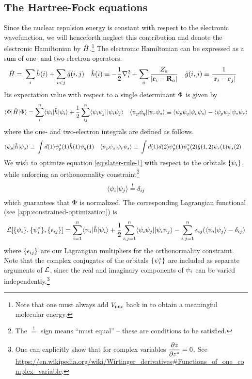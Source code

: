 \documentclass[11pt]{article}
\numberwithin{equation}{section}
\begin{document}
\subsection{The Hartree-Fock equations}

Since the nuclear repulsion energy is constant with respect to the electronic wavefunction, we will henceforth neglect this contribution and denote the electronic Hamiltonian by $\hat{H}$.\footnote{Note that one must always add $V_{\mathrm{nuc}}$ back in to obtain a meaningful molecular energy.}
The electronic Hamiltonian can be expressed as a sum of one- and two-electron operators.
\begin{align}
  \hat{H}
=&\
  \sum_i
  \hat{h}(i)
+
  \sum_{i<j}
  \hat{g}(i,j)
&
  \hat{h}(i)
&\equiv
-
  \frac {1}{2}
  \nabla_i^2
+
  \sum_a
  \frac {Z_a}{|\mathbf{r}_i-\mathbf{R}_a|}
&
  \hat{g}(i,j)
&\equiv
  \frac {1}{|\mathbf{r}_i-\mathbf{r}_j|}
\end{align}
Its expectation value with respect to a single determinant $\Phi $ is given by
\begin{align}
\label{eq:slater-rule-1}
  \langle\Phi |\hat{H}|\Phi \rangle
=
\sum_{i}^n
  \langle\psi _i|\hat{h}|\psi _i\rangle
+\frac {1}{2}\sum_{ij}^n
  \langle\psi _i\psi _j||\psi _i\psi _j\rangle
&&
  \langle\psi _p\psi _q||\psi _r\psi _s\rangle
\equiv
  \langle\psi _p\psi _q|\psi _r\psi _s\rangle
-
  \langle\psi _p\psi _q|\psi _s\psi _r\rangle
\end{align}
where the one- and two-electron integrals are defined as follows.
\begin{align}
\label{eq:one-and-two-electron-integrals}
  \langle\psi _p|\hat{h}|\psi _q\rangle
\equiv&\
  \int
  d(1)
  \psi _p^*(1)
  \hat{h}(1)
  \psi _q(1)
&
  \langle\psi _p\psi _q|\psi _r\psi _s\rangle
\equiv&\
  \int
  d(1)d(2)
  \psi _p^*(1)\psi _q^*(2)
  \hat{g}(1,2)
  \psi _r(1)\psi _s(2)
\end{align}
We wish to optimize equation \ref{eq:slater-rule-1} with respect to the orbitals $\{\psi _i\}$, while enforcing an orthonormality constraint\footnote{The $\overset{!}=$ sign means ``must equal'' -- these are conditions to be satisfied.}
\begin{align}
  \langle\psi _i|\psi _j\rangle
\overset{!}{=}
  \delta _{ij}
\end{align}
which guarantees that $\Phi $ is normalized.
The corresponding Lagrangian functional (see \cref{app:constrained-optimization}) is
\begin{align}\label{eq:hartree-fock-lagrangian}
  \mathcal{L}[\{\psi _i\},\{\psi _i^*\},\{\epsilon _{ij}\}]
=
  \sum_{i=1}^n
  \langle\psi _i|\hat{h}|\psi _i\rangle
+
  \frac {1}{2}
  \sum_{i,j=1}^n
  \langle\psi _i\psi _j||\psi _i\psi _j\rangle
-
  \sum_{i,j=1}^n
  \epsilon _{ij}(\langle\psi _i|\psi _j\rangle-\delta _{ij})
\end{align}
where $\{\epsilon _{ij}\}$ are our Lagrangian multipliers for the orthonormality constraint.
Note that the complex conjugates of the orbitals $\{\psi _i^*\}$ are included as separate arguments of $\mathcal{L}$, since the real and imaginary components of $\psi _i$ can be varied independently.\footnote{One can explicitly show that for complex variables $\dfrac{\partial z}{\partial z^*}=0$.  See \url{https://en.wikipedia.org/wiki/Wirtinger_derivatives#Functions_of_one_complex_variable}.}
\end{document}
